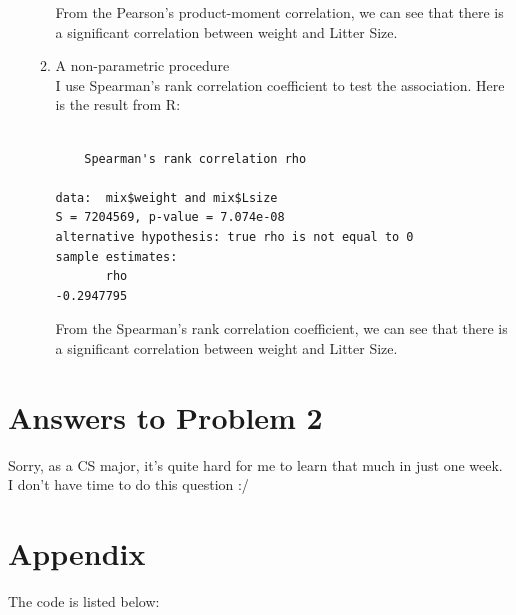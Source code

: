 \documentclass[12pt]{article}
\begin{document}
\begin{enumerate}
\begin{enumerate}
\begin{verbatim}
\end{verbatim}
 
    From the Pearson's product-moment correlation, we can see that
    there is a significant correlation between weight and Litter
    Size.
  \item A non-parametric procedure\\
    I use Spearman's rank correlation coefficient to test the
    association. Here is the result from R:

\begin{verbatim}

	Spearman's rank correlation rho

data:  mix$weight and mix$Lsize 
S = 7204569, p-value = 7.074e-08
alternative hypothesis: true rho is not equal to 0 
sample estimates:
       rho 
-0.2947795 

\end{verbatim}

    From the Spearman's rank correlation coefficient, we can see that
    there is a significant correlation between weight and Litter Size.

  \end{enumerate}

\end{enumerate}

\section{Answers to Problem 2}
 
Sorry, as a CS major, it's quite hard for me to learn that much in
just one week. I don't have time to do this question :/

\section{Appendix}
The code is listed below:


\end{document}

